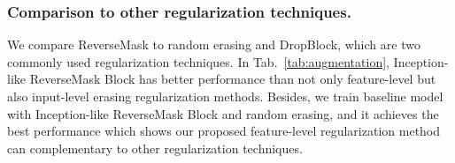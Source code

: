 \documentclass[runningheads]{llncs}
\begin{document}
\begin{table}[htbp]
\vspace*{-1.5em}
\caption{Effectiveness of ReverseMask regularization. To be noticed that the results of GaitSet are reproduced by~\cite{OpenGait}.}
\vspace*{-1em}
\centering
\footnotesize
{}
\label{fig:extend}
\vspace*{-3em}
\end{table}

\subsubsection{Comparison to other regularization techniques.} We compare ReverseMask to random erasing and DropBlock, which are two commonly used regularization techniques. In Tab.~\ref{tab:augmentation}, Inception-like ReverseMask Block has better performance than not only feature-level but also input-level erasing regularization methods. Besides, we train baseline model with Inception-like ReverseMask Block and random erasing, and it achieves the best performance which shows our proposed feature-level regularization method can complementary to other regularization techniques.
\end{document}
